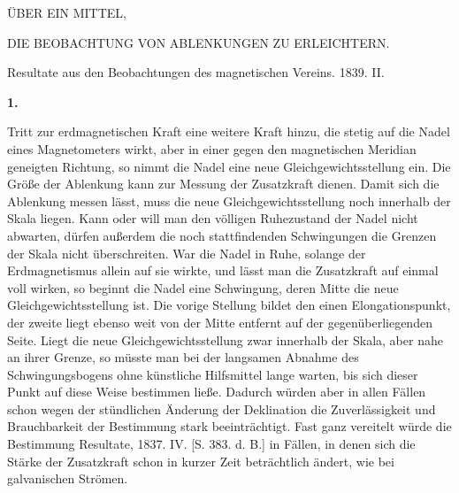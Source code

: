 \clearpage
{}
\begin{center}
{\large ÜBER EIN MITTEL,\par\medskip DIE BEOBACHTUNG VON ABLENKUNGEN ZU ERLEICHTERN.}
\par\medskip
Resultate aus den Beobachtungen des magnetischen Vereins. 1839. II.
\end{center}
\par\medskip{}\centerline{\textbf{1.}}\nobreak\smallskip
Tritt zur erdmagnetischen Kraft eine weitere Kraft hinzu, die stetig auf die Nadel eines Magnetometers wirkt, aber in einer gegen den magnetischen Meridian geneigten Richtung, so nimmt die Nadel eine neue Gleichgewichtsstellung ein. Die Größe der Ablenkung kann zur Messung der Zusatzkraft dienen. Damit sich die Ablenkung messen lässt, muss die neue Gleichgewichtsstellung noch innerhalb der Skala liegen. Kann oder will man den völligen Ruhezustand der Nadel nicht abwarten, dürfen außerdem die noch stattfindenden Schwingungen die Grenzen der Skala nicht überschreiten. War die Nadel in Ruhe, solange der Erdmagnetismus allein auf sie wirkte, und lässt man die Zusatzkraft auf einmal voll wirken, so beginnt die Nadel eine Schwingung, deren Mitte die neue Gleichgewichtsstellung ist. Die vorige Stellung bildet den einen Elongationspunkt, der zweite liegt ebenso weit von der Mitte entfernt auf der gegenüberliegenden Seite. Liegt die neue Gleichgewichtsstellung zwar innerhalb der Skala, aber nahe an ihrer Grenze, so müsste man bei der langsamen Abnahme des Schwingungsbogens ohne künstliche Hilfsmittel lange warten, bis sich dieser Punkt auf diese Weise bestimmen ließe. Dadurch würden aber in allen Fällen schon wegen der stündlichen Änderung der Deklination die Zuverlässigkeit und Brauchbarkeit der Bestimmung stark beeinträchtigt. Fast ganz vereitelt würde die Bestimmung
\expandafter\def\csname HistoricalNoteText404\endcsname{Resultate, 1837. IV. [S. 383. d. B.]}
\renewcommand{\Article}[1]{\par\medskip\Needspace{4\baselineskip}\pdfbookmark[1]{#1.}{ablenkungen-art-#1}\centerline{\textbf{#1.}}\nobreak\smallskip}%
in Fällen, in denen sich die Stärke der Zusatzkraft schon in kurzer Zeit beträchtlich ändert, wie bei galvanischen Strömen.


